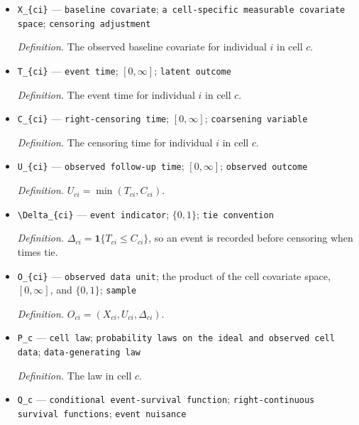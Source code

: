 \documentclass{article}
\begin{document}
\begin{itemize}
  \par\smallskip\noindent\emph{Definition.} The validation indices in fold \(f\) of cell \(c\).
  \item \texttt{X\_\allowbreak{}\{ci\}\allowbreak{}} --- \texttt{baseline covariate}; \texttt{a cell-\allowbreak{}specific measurable covariate space}; \texttt{censoring adjustment}
  \par\smallskip\noindent\emph{Definition.} The observed baseline covariate for individual \(i\) in cell \(c\).
  \item \texttt{T\_\allowbreak{}\{ci\}\allowbreak{}} --- \texttt{event time}; \([0,\infty]\); \texttt{latent outcome}
  \par\smallskip\noindent\emph{Definition.} The event time for individual \(i\) in cell \(c\).
  \item \texttt{C\_\allowbreak{}\{ci\}\allowbreak{}} --- \texttt{right-\allowbreak{}censoring time}; \([0,\infty]\); \texttt{coarsening variable}
  \par\smallskip\noindent\emph{Definition.} The censoring time for individual \(i\) in cell \(c\).
  \item \texttt{U\_\allowbreak{}\{ci\}\allowbreak{}} --- \texttt{observed follow-\allowbreak{}up time}; \([0,\infty]\); \texttt{observed outcome}
  \par\smallskip\noindent\emph{Definition.} \(U_{ci}=\min(T_{ci},C_{ci})\).
  \item \texttt{\textbackslash{}\allowbreak{}Delta\_\allowbreak{}\{ci\}\allowbreak{}} --- \texttt{event indicator}; \(\{0,1\}\); \texttt{tie convention}
  \par\smallskip\noindent\emph{Definition.} \(\Delta_{ci}=\mathbf 1\{T_{ci}\le C_{ci}\}\), so an event is recorded before censoring when times tie.
  \item \texttt{O\_\allowbreak{}\{ci\}\allowbreak{}} --- \texttt{observed data unit}; the product of the cell covariate space, \([0,\infty]\), and \(\{0,1\}\); \texttt{sample}
  \par\smallskip\noindent\emph{Definition.} \(O_{ci}=(X_{ci},U_{ci},\Delta_{ci})\).
  \item \texttt{P\_\allowbreak{}c} --- \texttt{cell law}; \texttt{probability laws on the ideal and observed cell data}; \texttt{data-\allowbreak{}generating law}
  \par\smallskip\noindent\emph{Definition.} The law in cell \(c\).
  \item \texttt{Q\_\allowbreak{}c} --- \texttt{conditional event-\allowbreak{}survival function}; \texttt{right-\allowbreak{}continuous survival functions}; \texttt{event nuisance}

\end{itemize}
\end{document}

